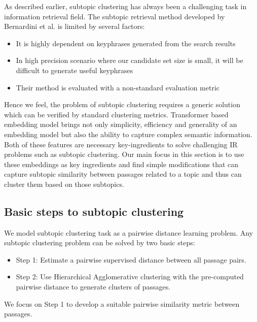 As described earlier, subtopic clustering has always been a challenging task in information retrieval field. The subtopic retrieval method developed by Bernardini et al. is limited by several factors: 
\begin{itemize}
    \item It is highly dependent on keyphrases generated from the search results
    \item In high precision scenario where our candidate set size is small, it will be difficult to generate useful keyphrases
    \item Their method is evaluated with a non-standard evaluation metric
\end{itemize}
Hence we feel, the problem of subtopic clustering requires a generic solution which can be verified by standard clustering metrics. Transformer based embedding model brings not only simplicity, efficiency and generality of an embedding model but also the ability to capture complex semantic information. Both of these features are necessary key-ingredients to solve challenging IR problems such as subtopic clustering. Our main focus in this section is to use these embeddings as key ingredients and find simple modifications that can capture subtopic similarity between passages related to a topic and thus can cluster them based on those subtopics.

\subsection{Basic steps to subtopic clustering} We model subtopic clustering task as a pairwise distance learning problem. Any subtopic clustering problem can be solved by two basic steps:
\begin{itemize}
    \item Step 1: Estimate a pairwise supervised distance between all passage pairs.
    \item Step 2: Use Hierarchical Agglomerative clustering with the pre-computed pairwise distance to generate clusters of passages.
\end{itemize}

We focus on Step 1 to develop a suitable pairwise similarity metric between passages.

